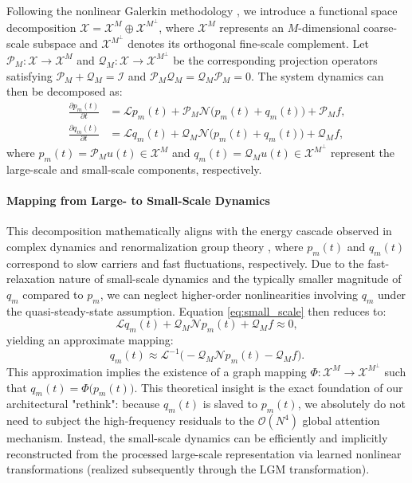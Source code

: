 \documentclass[final,3p,times]{elsarticle}
\begin{document}
Following the nonlinear Galerkin methodology \cite{foias1988inertial, marion1989nonlinear}, we introduce a functional space decomposition $\mathscr{X} = \mathscr{X}^M \oplus \mathscr{X}^{M^\perp}$, where $\mathscr{X}^M$ represents an $M$-dimensional coarse-scale subspace and $\mathscr{X}^{M^\perp}$ denotes its orthogonal fine-scale complement. Let $\mathscr{P}_M: \mathscr{X} \rightarrow \mathscr{X}^M$ and $\mathscr{Q}_M: \mathscr{X} \rightarrow \mathscr{X}^{M^\perp}$ be the corresponding projection operators satisfying $\mathscr{P}_M + \mathscr{Q}_M = \mathcal{I}$ and $\mathscr{P}_M \mathscr{Q}_M = \mathscr{Q}_M \mathscr{P}_M = 0$. The system dynamics can then be decomposed as:
\begin{subequations}
\label{eq:decomposed_dynamics}
\begin{align}
\frac{\partial p_m(t)}{\partial t} &= \mathscr{L}p_m(t) + \mathscr{P}_M\mathscr{N}\big(p_m(t) + q_m(t)\big) + \mathscr{P}_M f, \label{eq:large_scale} \\
\frac{\partial q_m(t)}{\partial t} &= \mathscr{L}q_m(t) + \mathscr{Q}_M\mathscr{N}\big(p_m(t) + q_m(t)\big) + \mathscr{Q}_M f, \label{eq:small_scale}
\end{align}
\end{subequations}
where $p_m(t) = \mathscr{P}_M u(t) \in \mathscr{X}^M$ and $q_m(t) = \mathscr{Q}_M u(t) \in \mathscr{X}^{M^\perp}$ represent the large-scale and small-scale components, respectively.

\paragraph{Mapping from Large- to Small-Scale Dynamics}
This decomposition mathematically aligns with the energy cascade observed in complex dynamics and renormalization group theory \cite{chen1994}, where $p_m(t)$ and $q_m(t)$ correspond to slow carriers and fast fluctuations, respectively. Due to the fast-relaxation nature of small-scale dynamics and the typically smaller magnitude of $q_m$ compared to $p_m$, we can neglect higher-order nonlinearities involving $q_m$ under the quasi-steady-state assumption. Equation \eqref{eq:small_scale} then reduces to:
\begin{equation}
\mathscr{L}q_m(t) + \mathscr{Q}_M \mathscr{N}p_m(t) + \mathscr{Q}_M f \approx 0,
\label{eq:quasi_steady}
\end{equation}
yielding an approximate mapping:
\begin{equation}
q_m(t) \approx \mathscr{L}^{-1}\Big(-\mathscr{Q}_M \mathscr{N}p_m(t) - \mathscr{Q}_M f\Big).
\label{eq:small_scale_mapping}
\end{equation}
This approximation implies the existence of a graph mapping $\Phi: \mathscr{X}^M \rightarrow \mathscr{X}^{M^\perp}$ such that $q_m(t) = \Phi\big(p_m(t)\big)$. This theoretical insight is the exact foundation of our architectural "rethink": because $q_m(t)$ is slaved to $p_m(t)$, we absolutely do not need to subject the high-frequency residuals to the $\mathcal{O}(N^4)$ global attention mechanism. Instead, the small-scale dynamics can be efficiently and implicitly reconstructed from the processed large-scale representation via learned nonlinear transformations (realized subsequently through the LGM transformation).
\end{document}
